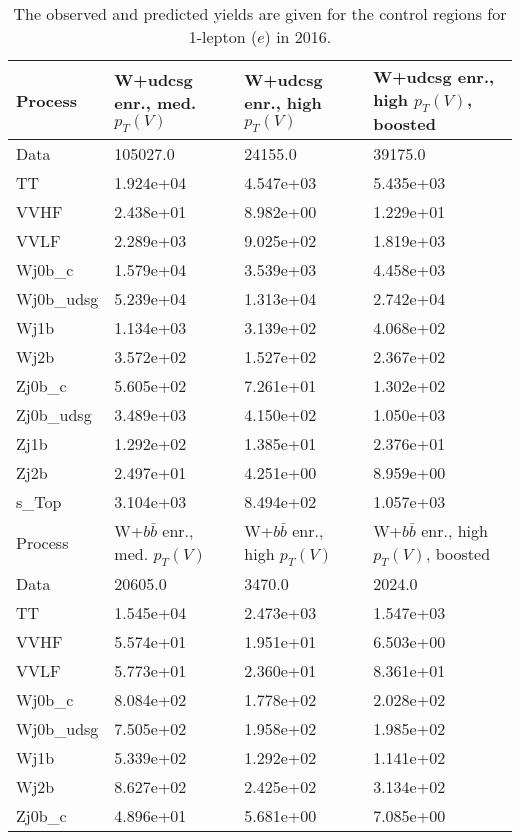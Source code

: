 \begin{table}
\centering
\caption[2016 1-lepton ($e$) control region yields]{
                  The observed and predicted yields are given for the
                  control regions for 1-lepton ($e$) in 2016.
                  }
{\footnotesize
\begin{tabularx}{0.8\textwidth}{|X|X|X|X|}
\hline
Process & W+udcsg enr., med. $p_{T}(V)$ & W+udcsg enr., high $p_{T}(V)$ & W+udcsg enr., high $p_{T}(V)$, boosted \\
\hline
Data & 105027.0 & 24155.0 & 39175.0 \\
\hline
TT & 1.924e+04 & 4.547e+03 & 5.435e+03 \\
VVHF & 2.438e+01 & 8.982e+00 & 1.229e+01 \\
VVLF & 2.289e+03 & 9.025e+02 & 1.819e+03 \\
Wj0b\_c & 1.579e+04 & 3.539e+03 & 4.458e+03 \\
Wj0b\_udsg & 5.239e+04 & 1.313e+04 & 2.742e+04 \\
Wj1b & 1.134e+03 & 3.139e+02 & 4.068e+02 \\
Wj2b & 3.572e+02 & 1.527e+02 & 2.367e+02 \\
Zj0b\_c & 5.605e+02 & 7.261e+01 & 1.302e+02 \\
Zj0b\_udsg & 3.489e+03 & 4.150e+02 & 1.050e+03 \\
Zj1b & 1.292e+02 & 1.385e+01 & 2.376e+01 \\
Zj2b & 2.497e+01 & 4.251e+00 & 8.959e+00 \\
s\_Top & 3.104e+03 & 8.494e+02 & 1.057e+03 \\
\hline
\hline
Process & W+$b\bar{b}$ enr., med. $p_{T}(V)$ & W+$b\bar{b}$ enr., high $p_{T}(V)$ & W+$b\bar{b}$ enr., high $p_{T}(V)$, boosted \\
\hline
Data & 20605.0 & 3470.0 & 2024.0 \\
\hline
TT & 1.545e+04 & 2.473e+03 & 1.547e+03 \\
VVHF & 5.574e+01 & 1.951e+01 & 6.503e+00 \\
VVLF & 5.773e+01 & 2.360e+01 & 8.361e+01 \\
Wj0b\_c & 8.084e+02 & 1.778e+02 & 2.028e+02 \\
Wj0b\_udsg & 7.505e+02 & 1.958e+02 & 1.985e+02 \\
Wj1b & 5.339e+02 & 1.292e+02 & 1.141e+02 \\
Wj2b & 8.627e+02 & 2.425e+02 & 3.134e+02 \\
Zj0b\_c & 4.896e+01 & 5.681e+00 & 7.085e+00 \\

\end{tabularx}}
\end{table}

